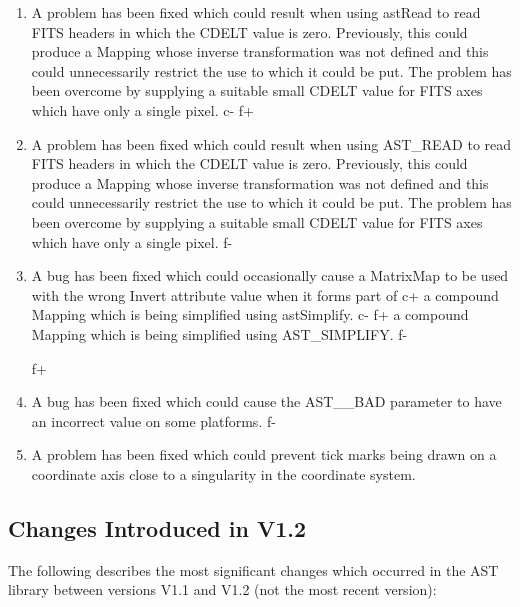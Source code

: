 \documentclass[twoside,11pt]{starlink}
\begin{document}
\begin{enumerate}
c+
\item A problem has been fixed which could result when using astRead
to read FITS headers in which the CDELT value is zero. Previously,
this could produce a Mapping whose inverse transformation was not
defined and this could unnecessarily restrict the use to which it
could be put. The problem has been overcome by supplying a suitable
small CDELT value for FITS axes which have only a single pixel.
c-
f+
\item A problem has been fixed which could result when using AST\_READ
to read FITS headers in which the CDELT value is zero. Previously,
this could produce a Mapping whose inverse transformation was not
defined and this could unnecessarily restrict the use to which it
could be put. The problem has been overcome by supplying a suitable
small CDELT value for FITS axes which have only a single pixel.
f-

\item A bug has been fixed which could occasionally cause a MatrixMap
to be used with the wrong Invert attribute value when it forms part of
c+
a compound Mapping which is being simplified using astSimplify.
c-
f+
a compound Mapping which is being simplified using AST\_SIMPLIFY.
f-

f+
\item A bug has been fixed which could cause the AST\_\_BAD parameter
to have an incorrect value on some platforms.
f-

\item A problem has been fixed which could prevent tick marks being
drawn on a coordinate axis close to a singularity in the coordinate
system.
\end{enumerate}

\subsection{Changes Introduced in V1.2}

The following describes the most significant changes which occurred in
the AST library between versions V1.1 and V1.2 (not the most recent
version):
\end{document}
